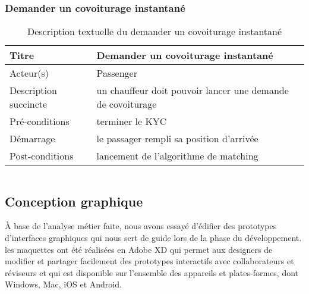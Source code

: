 \subsubsection{Demander un covoiturage instantané} %
\begin{table}[H]
\begin{center}
    \begin{tabular}{ | l | p{10cm} | }
    \hline
    Titre & Demander un covoiturage instantané \\ \hline
    Acteur(s) & Passenger \\ \hline
    Description succincte & un chauffeur doit pouvoir lancer une demande de covoiturage \\ \hline
    Pré-conditions & terminer le KYC \\ \hline
    Démarrage & le passager rempli sa position d'arrivée \\ \hline
    Post-conditions & lancement de l'algorithme de matching \\ \hline
    \end{tabular}
    \caption{Description textuelle du demander un covoiturage instantané}
\end{center}
\end{table}

\begin{tabular}{c}

\end{tabular}

\subsection{Conception graphique} %
\label{sub:ihm}
À base de l'analyse métier faite, nous avons essayé d’édifier des prototypes d'interfaces graphiques qui nous sert de guide lors de la phase du développement.\newline
les maquettes ont été réalisées en Adobe XD qui permet aux designers de modifier et partager facilement des prototypes interactifs avec collaborateurs et réviseurs et qui est disponible sur l'ensemble des appareils et plates-formes, dont Windows, Mac, iOS et Android.

